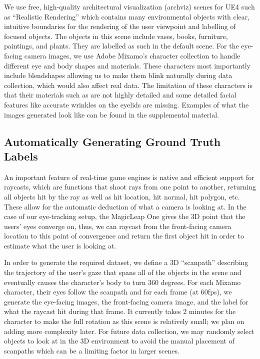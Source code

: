 We use free, high-quality architectural visualization (archviz) scenes for UE4
such as ``Realistic Rendering'' which contains many environmental objects with
clear, intuitive boundaries for the rendering of the user viewpoint and
labelling of focused objects. The objects in this scene include vases, books,
furniture, paintings, and plants. They are labelled as such in the default
scene. For the eye-facing camera images, we use Adobe Mixamo's character
collection to handle different eye and body shapes and materials. These
characters most importantly include blendshapes allowing us to make them blink
naturally during data collection, which would also affect real data. The
limitation of these characters is that their materials such as are not highly
detailed and some detailed facial features like accurate wrinkles on the eyelids
are missing. Examples of what the images generated look like can be found in the
supplemental material.

\subsection{Automatically Generating Ground Truth Labels}

An important feature of real-time game engines is native and efficient support
for raycasts, which are functions that shoot rays from one point to another,
returning all objects hit by the ray as well as hit location, hit normal, hit
polygon, etc. These allow for the automatic deduction of what a camera is
looking at. In the case of our eye-tracking setup, the MagicLeap One gives the
3D point that the users' eyes converge on, thus, we can raycast from the
front-facing camera location to this point of convergence and return the first
object hit in order to estimate what the user is looking at.

In order to generate the required dataset, we define a 3D ``scanpath''
describing the trajectory of the user's gaze that spans all of the objects in
the scene and eventually causes the character's body to turn 360 degrees. For
each Mixamo character, their eyes follow the scanpath and for each frame (at
60fps), we generate the eye-facing images, the front-facing camera image, and
the label for what the raycast hit during that frame. It currently takes 2
minutes for the character to make the full rotation as this scene is relatively
small; we plan on adding more complexity later. For future data collection, we
may randomly select objects to look at in the 3D environment to avoid the manual
placement of scanpaths which can be a limiting factor in larger scenes.

